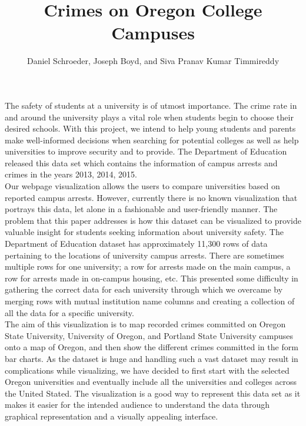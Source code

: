 \documentclass[journal]{vgtc}                %
\title{Crimes on Oregon College Campuses}
\author{Daniel Schroeder, Joseph Boyd, and Siva Pranav Kumar Timmireddy}
\begin{document}


\maketitle

The safety of students at a university is of utmost importance. The crime rate in and around the university plays a vital role when students begin to choose their desired schools. With this project, we intend to help young students and parents make well-informed decisions when searching for potential colleges as well as help universities to improve security and to provide. The Department of Education released this data set which contains the information of campus arrests and crimes in the years 2013, 2014, 2015.\\
\indent Our webpage visualization allows the users to compare universities based on reported campus arrests. However, currently there is no known visualization that portrays this data, let alone in a fashionable and user-friendly manner. The problem that this paper addresses is how this dataset can be visualized to provide valuable insight for students seeking information about university safety. The Department of Education dataset has approximately 11,300 rows of data pertaining to the locations of university campus arrests. There are sometimes multiple rows for one university; a row for arrests made on the main campus, a row for arrests made in on-campus housing, etc. This presented some difficulty in gathering the correct data for each university through which we overcame by merging rows with mutual institution name columns and creating a collection of all the data for a specific university.\\
\indent The aim of this visualization is to map recorded crimes committed on Oregon State University, University of Oregon, and Portland State University campuses onto a map of Oregon, and then show the different crimes committed in the form bar charts. As the dataset is huge and handling such a vast dataset may result in complications while visualizing, we have decided to first start with the selected Oregon universities and eventually include all the universities and colleges across the United Stated. The visualization is a good way to represent this data set as it makes it easier for the intended audience to understand the data through graphical representation and a visually appealing interface.\\ \\
\end{document}
